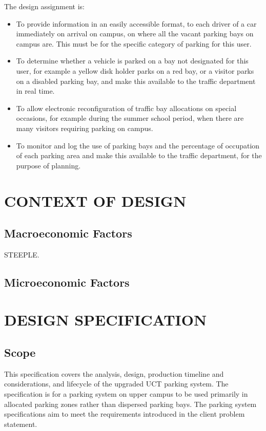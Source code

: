 The design assignment is:

\begin{itemize}
\item To provide information in an easily accessible format, to each driver of a car immediately on arrival on campus, on where all the vacant parking bays on campus are. This must be for the specific category of parking for this user.

\item To determine whether a vehicle is parked on a bay not designated for this user, for example a yellow disk holder parks on a red bay, or a visitor parks on a disabled parking bay, and make this available to the traffic department in real time.

\item To  allow electronic reconfiguration  of  traffic  bay allocations  on  special  occasions, for example during the summer school period, when there are many visitors requiring parking on campus.

\item To monitor and log the use of parking bays and the percentage of occupation of each parking area and make this available to the traffic department, for the purpose of planning.\cite{assignment}
\end{itemize}

\newpage
\section{CONTEXT OF DESIGN}
\subsection{Macroeconomic Factors}
STEEPLE.
\subsection{Microeconomic Factors}


\newpage
\section{DESIGN SPECIFICATION}
\subsection{Scope}
This specification covers the analysis, design, production timeline and considerations, and lifecycle of the upgraded UCT parking system. The specification is for a parking system on upper campus to be used primarily in allocated parking zones rather than dispersed parking bays. The parking system specifications aim to meet the requirements introduced in the client problem statement.

